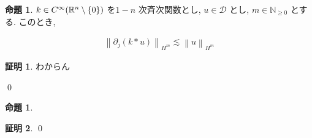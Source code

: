 \documentclass[10pt, fleqn, label-section=none]{bxjsarticle}
\theoremstyle{definition}
\newtheorem{prop}[dfn]{命題}
\newtheorem*{pf*}{証明}
\newcommand{\cbra}[1]{\mleft\{#1\mright\}}
\newcommand{\norm}[1]{\left\|#1\right\|}
\renewcommand{\;}{\, ; \,}
\begin{document}
\begin{prop}$k \in C^\infty (\mathbb R^n \setminus \cbra{0} )$ を$1- n$ 次斉次関数とし, $u \in \mathcal D $ とし, $m \in \mathbb N_{\geq 0}$ とする. このとき, 

\begin{align*} \norm{\partial_j (k * u) }_{H^m} \lesssim \norm{u}_{H^m} \end{align*}

\end{prop}
\begin{pf*}

わからん

\qed
\end{pf*}

\begin{prop}

\end{prop}
\begin{pf*}

\qed
\end{pf*}
\end{document}
